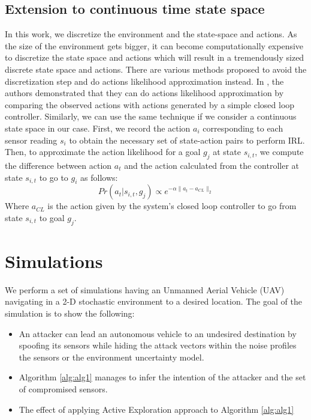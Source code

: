 \documentclass[letterpaper, 10 pt, conference]{ieeeconf}  %
\begin{document}
\subsection{Extension to continuous time state space}
In this work, we discretize the environment and the state-space and actions. As the size of the environment gets bigger, it can become computationally expensive to discretize the state space and actions which will result in a tremendously sized discrete state space and actions. There are various methods proposed to avoid the discretization step and do actions likelihood approximation instead. In \cite{Michini2013}, the authors demonstrated that they can do actions likelihood approximation by comparing the observed actions with actions generated by a simple closed loop controller. Similarly, we can use the same technique if we consider a continuous state space in our case. First, we record the action $a_i$ corresponding to each sensor reading $s_i$ to obtain the necessary set of state-action pairs to perform IRL. Then, to approximate the action likelihood for a goal $g_j$ at state $s_{i,t}$, we compute the difference between action $a_t$ and the action calculated from the controller at state $s_{i,t}$ to go to $g_i$ as follows:
\begin{equation}
 Pr(a_t|s_{i,t},g_j) \propto e^{-\alpha \lVert a_t - a_{CL} \rVert_{2}}
\end{equation}
Where $a_{CL}$ is the action given by the system's closed loop controller to go from state $s_{i,t}$ to goal $g_j$.
\section{Simulations}\label{sec:simulations}
We perform a set of simulations having an Unmanned Aerial Vehicle (UAV) navigating in a 2-D stochastic environment to a desired location. The goal of the simulation is to show the following:
\begin{itemize}
    \item An attacker can lead an autonomous vehicle to an undesired destination by spoofing its sensors while hiding the attack vectors within the noise profiles the sensors or the environment uncertainty model.
    \item Algorithm \ref{alg:alg1} manages to infer the intention of the attacker and the set of compromised sensors.
    \item The effect of applying Active Exploration approach to Algorithm \ref{alg:alg1}
\end{itemize}
\end{document}
